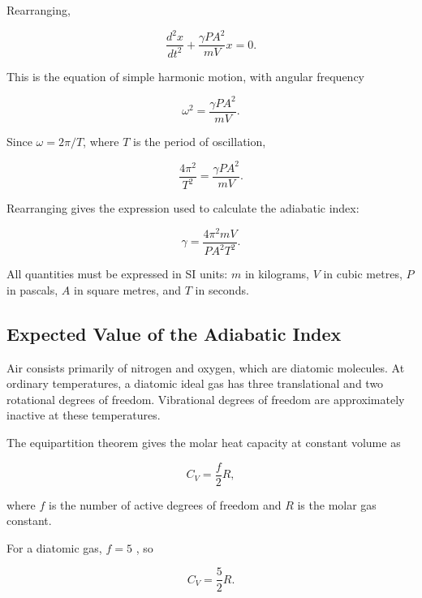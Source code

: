 \documentclass[12pt,a4paper]{article}
\begin{document}
Rearranging,

\begin{equation}
    \boxed{
    \frac{d^2x}{dt^2}
    +\frac{\gamma PA^2}{mV}x=0
    }.
    \label{eq:shm}
\end{equation}

This is the equation of simple harmonic motion, with angular
frequency

\begin{equation}
    \omega^2=\frac{\gamma PA^2}{mV}.
\end{equation}

Since $\omega=2\pi/T$, where $T$ is the period of oscillation,

\begin{equation}
    \frac{4\pi^2}{T^2}
    =\frac{\gamma PA^2}{mV}.
\end{equation}

Rearranging gives the expression used to calculate the adiabatic
index:

\begin{equation}
    \boxed{
    \gamma=\frac{4\pi^2mV}{PA^2T^2}
    }.
    \label{eq:gamma}
\end{equation}

All quantities must be expressed in SI units:
$m$ in kilograms, $V$ in cubic metres, $P$ in pascals,
$A$ in square metres, and $T$ in seconds.

\subsection{Expected Value of the Adiabatic Index}

Air consists primarily of nitrogen and oxygen, which are
diatomic molecules. At ordinary temperatures, a diatomic ideal
gas has three translational and two rotational degrees of
freedom. Vibrational degrees of freedom are approximately
inactive at these temperatures.

The equipartition theorem gives the molar heat capacity at
constant volume as

\begin{equation}
    C_V=\frac{f}{2}R,
\end{equation}

where $f$ is the number of active degrees of freedom and $R$
is the molar gas constant.

For a diatomic gas, $f=5$ \cite{py2107}, so

\begin{equation}
    C_V=\frac{5}{2}R.
\end{equation}
\end{document}
